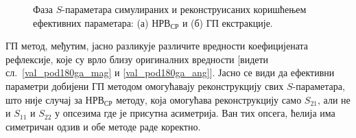 \begin{figure}[!t]
\centering
{}
\caption{Фаза $S$-параметара симулираних и реконструисаних коришћењем ефективних параметара: (а) $НРВ_{СР}$ и (б) ГП екстракције.}
\label{val_pod180_ang}
\end{figure}

ГП метод, међутим, јасно разликује различите вредности коефицијената рефлексије, које су врло близу оригиналних вредности [видети сл.~\ref{val_pod180ga_mag} и \ref{val_pod180ga_ang}]. Јасно се види да ефективни параметри добијени ГП методом омогућавају реконструкцију свих $S$-параметара, што није случај за $НРВ_{СР}$ методу, која омогућава реконструкцију само $S_{21}$, али не и $S_{11}$ и $S_{22}$ у опсезима где је присутна асиметрија. Ван тих опсега, ћелија има симетричан одзив и обе методе раде коректно.


